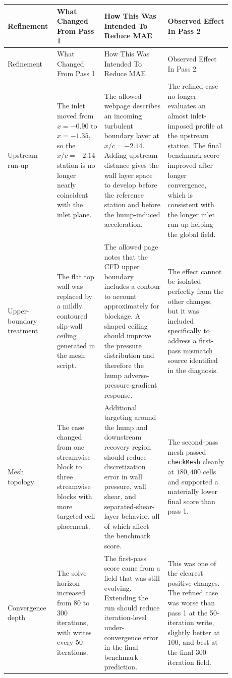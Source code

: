 \documentclass[11pt]{article}
\begin{document}
\small
\begin{longtable}{p{0.16\linewidth} p{0.18\linewidth} p{0.27\linewidth} p{0.27\linewidth}}
\toprule
Refinement & What Changed From Pass 1 & How This Was Intended To Reduce MAE & Observed Effect In Pass 2 \\
\midrule
\endfirsthead
\toprule
Refinement & What Changed From Pass 1 & How This Was Intended To Reduce MAE & Observed Effect In Pass 2 \\
\midrule
\endhead
Upstream run-up & The inlet moved from \(x=-0.90\) to \(x=-1.35\), so the \(x/c=-2.14\) station is no longer nearly coincident with the inlet plane. & The allowed webpage describes an incoming turbulent boundary layer at \(x/c=-2.14\). Adding upstream distance gives the wall layer space to develop before the reference station and before the hump-induced acceleration. & The refined case no longer evaluates an almost inlet-imposed profile at the upstream station. The final benchmark score improved after longer convergence, which is consistent with the longer inlet run-up helping the global field. \\
Upper-boundary treatment & The flat top wall was replaced by a mildly contoured slip-wall ceiling generated in the mesh script. & The allowed page notes that the CFD upper boundary includes a contour to account approximately for blockage. A shaped ceiling should improve the pressure distribution and therefore the hump adverse-pressure-gradient response. & The effect cannot be isolated perfectly from the other changes, but it was included specifically to address a first-pass mismatch source identified in the diagnosis. \\
Mesh topology & The case changed from one streamwise block to three streamwise blocks with more targeted cell placement. & Additional targeting around the hump and downstream recovery region should reduce discretization error in wall pressure, wall shear, and separated-shear-layer behavior, all of which affect the benchmark score. & The second-pass mesh passed \texttt{checkMesh} cleanly at \(180{,}400\) cells and supported a materially lower final score than pass 1. \\
Convergence depth & The solve horizon increased from 80 to 300 iterations, with writes every 50 iterations. & The first-pass score came from a field that was still evolving. Extending the run should reduce iteration-level under-convergence error in the final benchmark prediction. & This was one of the clearest positive changes. The refined case was worse than pass 1 at the 50-iteration write, slightly better at 100, and best at the final 300-iteration field. \\

\end{longtable}
\end{document}
